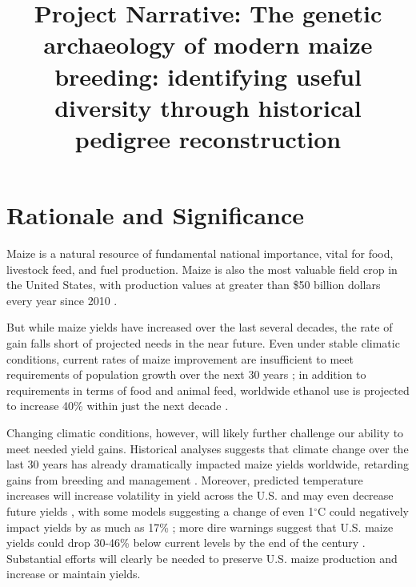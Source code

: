 \documentclass[12pt]{article}
\begin{document}
\title{Project Narrative: The genetic archaeology of modern maize breeding: identifying useful diversity through historical pedigree reconstruction}
\author{}
\date{}
\maketitle

\section*{Rationale and Significance}
\label{sec:rationale}

Maize is a natural resource of fundamental national importance, vital for food, livestock feed, and fuel production.
Maize is also the most valuable field crop in the United States, with production values at greater than \$50 billion dollars every year since 2010 \citep{usdanass}. 

But while maize yields have increased over the last several decades, the rate of gain falls short of projected needs in the near future.
%
%
Even under stable climatic conditions, current rates of maize improvement are insufficient to meet requirements of population growth over the next 30 years \citep{ray2013yield}; in  addition to requirements in terms of food and animal feed, worldwide ethanol use is projected to increase 40\% within just the next decade \citep{usdalong}.

Changing climatic conditions, however, will likely further challenge our ability to meet needed yield gains. 
Historical analyses suggests that climate change over the last 30 years has already dramatically impacted maize yields worldwide, retarding gains from breeding and management \citep{Lobell2011}.
Moreover, predicted temperature increases will increase volatility in yield across the U.S. and may even decrease future yields \citep{urban2012projected}, with some models suggesting a change of even 1$^{\circ}$C could negatively impact yields by as much as 17\% \citep{lobell2003climate}; more dire warnings suggest that U.S. maize yields could drop 30-46\% below current levels by the end of the century \citep{schlenker2009nonlinear}.
Substantial efforts will clearly be needed to preserve U.S. maize production and increase or maintain yields.  
\end{document}
